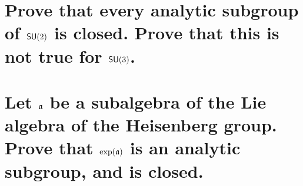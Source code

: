 \documentclass[
	pages,
	boxes,
	color=WildStrawberry
]{homework}
\begin{document}
\begin{problem}
\begin{parts}
	\part{Prove that every analytic subgroup of $\mathsf{SU}(2)$ is closed. Prove that this is not true for $\mathsf{SU}(3)$.}\label{part:10a}
	\part{Let $\mathfrak{a}$ be a subalgebra of the Lie algebra of the Heisenberg group. Prove that $\exp(\mathfrak{a})$ is an analytic subgroup, and is closed.}\label{part:10b}
\end{parts}
\end{problem}
\end{document}

